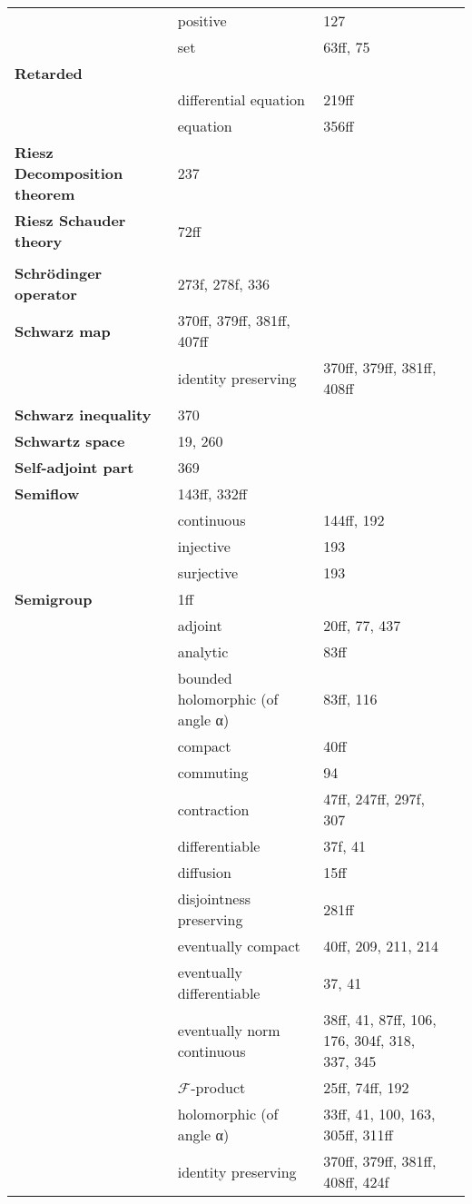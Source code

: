 \documentclass[10pt]{scrartcl}
\begin{document}
\begin{longtable}{>{\bfseries}p{4cm}p{4cm}p{4cm}p{4cm}}
	& positive 	& 127 \\
	& set 	& 63ff, 75 \\
Retarded 	& \\
	& differential equation 	& 219ff \\
	& equation 	& 356ff \\
Riesz Decomposition theorem 	& 237 \\
Riesz Schauder theory 	& 72ff \\
	& \\
Schrödinger operator 	& 273f, 278f, 336 \\
Schwarz map 	& 370ff, 379ff, 381ff, 407ff \\
	& identity preserving 	& 370ff, 379ff, 381ff, 408ff \\
Schwarz inequality 	& 370 \\
Schwartz space 	& 19, 260 \\
Self-adjoint part 	& 369 \\
Semiflow 	& 143ff, 332ff \\
	& continuous 	& 144ff, 192 \\
	& injective 	& 193 \\
	& surjective 	& 193 \\
Semigroup 	& 1ff \\
	& adjoint 	& 20ff, 77, 437 \\
	& analytic 	& 83ff \\
	& bounded holomorphic (of angle α) 	& 83ff, 116 \\
	& compact 	& 40ff \\
	& commuting 	& 94 \\
	& contraction 	& 47ff, 247ff, 297f, 307 \\
	& differentiable 	& 37f, 41 \\
	& diffusion 	& 15ff \\
	& disjointness preserving 	& 281ff \\
	& eventually compact 	& 40ff, 209, 211, 214 \\
	& eventually differentiable 	& 37, 41 \\
	& eventually norm continuous 	& 38ff, 41, 87ff, 106, 176, 304f, 318, 337, 345 \\
	& $\mathcal{F}$-product 	& 25ff, 74ff, 192 \\
	& holomorphic (of angle α) 	& 33ff, 41, 100, 163, 305ff, 311ff \\
	& identity preserving 	& 370ff, 379ff, 381ff, 408ff, 424f \\

\end{longtable}
\end{document}
